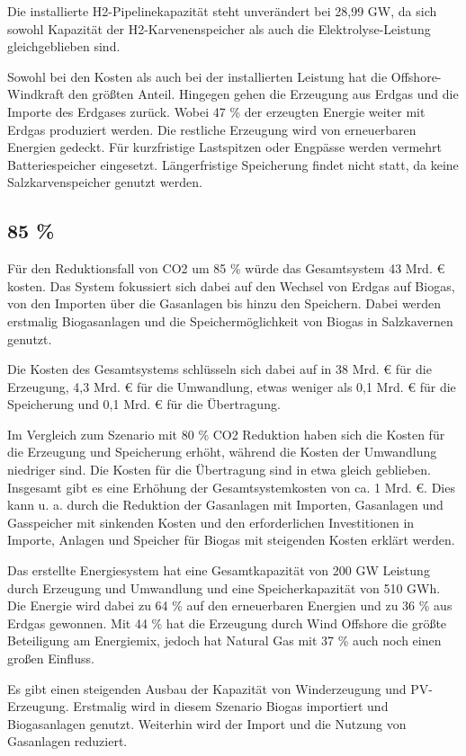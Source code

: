 Die installierte H2-Pipelinekapazität steht unverändert bei 28,99 GW, da sich sowohl Kapazität der H2-Karvenenspeicher als auch die Elektrolyse-Leistung gleichgeblieben sind.

Sowohl bei den Kosten als auch bei der installierten Leistung hat die Offshore-Windkraft den größten Anteil. Hingegen gehen die Erzeugung aus Erdgas und die Importe des Erdgases zurück. Wobei 47 \% der erzeugten Energie weiter mit Erdgas produziert werden. Die restliche Erzeugung wird von erneuerbaren Energien gedeckt. Für kurzfristige Lastspitzen oder Engpässe werden vermehrt Batteriespeicher eingesetzt. Längerfristige Speicherung findet nicht statt, da keine Salzkarvenspeicher genutzt werden.


\subsection{85 \%}
Für den Reduktionsfall von CO2 um 85 \% würde das Gesamtsystem 43 Mrd. € kosten. Das System fokussiert sich dabei auf den Wechsel von Erdgas auf Biogas, von den Importen über die Gasanlagen bis hinzu den Speichern. Dabei werden erstmalig Biogasanlagen und die Speichermöglichkeit von Biogas in Salzkavernen genutzt.

Die Kosten des Gesamtsystems schlüsseln sich dabei auf in 38 Mrd. € für die Erzeugung, 4,3 Mrd. € für die Umwandlung, etwas weniger als 0,1 Mrd. € für die Speicherung und 0,1 Mrd. € für die Übertragung.

Im Vergleich zum Szenario mit 80 \% CO2 Reduktion haben sich die Kosten für die Erzeugung und Speicherung erhöht, während die Kosten der Umwandlung niedriger sind. Die Kosten für die Übertragung sind in etwa gleich geblieben. 
Insgesamt gibt es eine Erhöhung der Gesamtsystemkosten von ca. 1 Mrd. €. Dies kann u. a. durch die Reduktion der Gasanlagen mit Importen, Gasanlagen und Gasspeicher mit sinkenden Kosten und den erforderlichen Investitionen in Importe, Anlagen und Speicher für Biogas mit steigenden Kosten erklärt werden.

Das erstellte Energiesystem hat eine Gesamtkapazität von 200 GW Leistung durch Erzeugung und Umwandlung und eine Speicherkapazität von 510 GWh. Die Energie wird dabei zu 64 \% auf den erneuerbaren Energien und zu 36 \% aus Erdgas gewonnen. Mit 44 \% hat die Erzeugung durch Wind Offshore die größte Beteiligung am Energiemix, jedoch hat Natural Gas mit 37 \% auch noch einen großen Einfluss.

Es gibt einen steigenden Ausbau der Kapazität von Winderzeugung und PV-Erzeugung. Erstmalig wird in diesem Szenario Biogas importiert und Biogasanlagen genutzt. Weiterhin wird der Import und die Nutzung von Gasanlagen reduziert.

